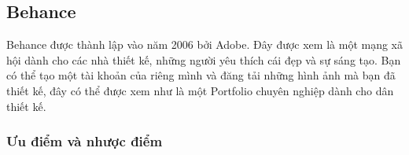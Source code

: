\par 

\subsection{Behance}


Behance được thành lập vào năm 2006 bởi Adobe. Đây được xem là một mạng xã hội dành cho các nhà thiết kế,
 những người yêu thích cái đẹp và sự sáng tạo. Bạn có thể tạo một tài khoản của riêng mình và đăng tải những
  hình ảnh mà bạn đã thiết kế, đây có thể được xem như là một Portfolio chuyên nghiệp dành cho dân thiết kế.






\subsubsection{Ưu điểm và nhược điểm}

